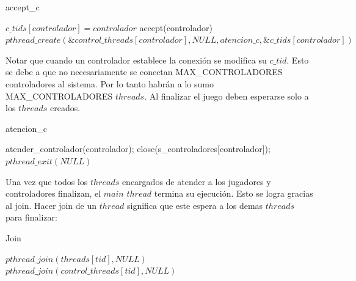 \begin{algorithm}[H]
\caption{accept\_c}\label{ej1}
\begin{algorithmic}[1]
		\State $c\_tids[controlador]= controlador$
		\State accept(controlador)
		\State $pthread\_create(\&control\_threads[controlador],NULL,atencion\_c,\&c\_tids[controlador])$
	\EndFor
\EndProcedure
\end{algorithmic}
\end{algorithm}

Notar que cuando un controlador establece la conexión se modifica su $c\_tid$. Esto se debe a que no necesariamente se conectan MAX\_CONTROLADORES controladores al sistema. Por lo tanto habrán a lo sumo MAX\_CONTROLADORES $threads$. Al finalizar el juego deben esperarse solo a los $threads$ creados.

\begin{algorithm}[H]
\caption{atencion\_c}\label{ej1}
\begin{algorithmic}[1]
	\State atender\_controlador(controlador);
	\State close(s\_controladores[controlador]);
	\State $pthread\_exit(NULL)$
\EndProcedure
\end{algorithmic}
\end{algorithm}

Una vez que todos los $threads$ encargados de atender a los jugadores y controladores finalizan, el $main$ $thread$ termina su ejecución. Esto se logra gracias al join. Hacer join de un $thread$ significa que este espera a los demas $threads$ para finalizar:

\begin{algorithm}[H]
\caption{Join}\label{ej1}
\begin{algorithmic}[1]
		\State $pthread\_join(threads[tid], NULL)$
	\EndFor
	 
		\State $pthread\_join(control\_threads[tid], NULL)$
	\EndFor
\EndProcedure
\end{algorithmic}
\end{algorithm}
